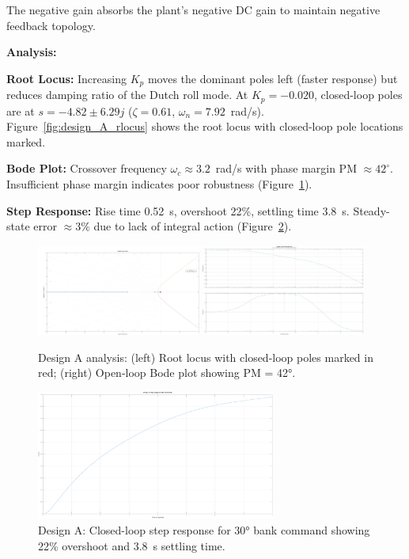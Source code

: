 The negative gain absorbs the plant's negative DC gain to maintain negative feedback topology.

\textbf{Analysis:}

\textbf{Root Locus:} Increasing $K_p$ moves the dominant poles left (faster response) but reduces damping ratio of the Dutch roll mode. At $K_p=-0.020$, closed-loop poles are at $s = -4.82 \pm 6.29j$ ($\zeta=0.61$, $\omega_n=7.92$~rad/s). Figure~\ref{fig:design_A_rlocus} shows the root locus with closed-loop pole locations marked.

\textbf{Bode Plot:} Crossover frequency $\omega_c \approx 3.2$~rad/s with phase margin PM $\approx 42^\circ$. Insufficient phase margin indicates poor robustness (Figure~\ref{fig:design_A_bode}).

\textbf{Step Response:} Rise time 0.52~s, overshoot 22\%, settling time 3.8~s. Steady-state error $\approx 3\%$ due to lack of integral action (Figure~\ref{fig:design_A_step}).

\begin{figure}[h!]
\centering
\includegraphics[width=0.48\textwidth]{../MATLAB/LaTeX_Exports/design_A_root_locus.pdf}
\includegraphics[width=0.48\textwidth]{../MATLAB/LaTeX_Exports/design_A_bode.pdf}
\caption{Design A analysis: (left) Root locus with closed-loop poles marked in red; (right) Open-loop Bode plot showing PM = 42°.}
\label{fig:design_A_rlocus}
\label{fig:design_A_bode}
\end{figure}

\begin{figure}[h!]
\centering
\includegraphics[width=0.7\textwidth]{../MATLAB/LaTeX_Exports/design_A_step.pdf}
\caption{Design A: Closed-loop step response for 30° bank command showing 22\% overshoot and 3.8~s settling time.}
\label{fig:design_A_step}
\end{figure}

